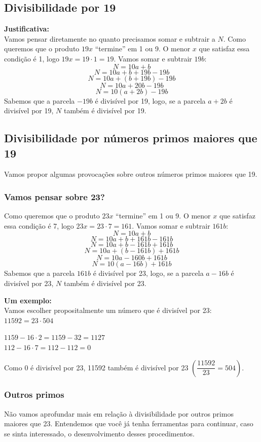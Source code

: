 \documentclass[12pt,a4paper]{article}
\begin{document}
		\subsection{Divisibilidade por 19}
		\textbf{Justificativa:}\\
		Vamos pensar diretamente no quanto precisamos somar e subtrair a $N$. Como queremos que o produto $19x$ ``termine'' em 1 ou 9. O menor $x$ que satisfaz essa condição é 1, logo $19x = 19 \cdot 1 = 19$. Vamos somar e subtrair $19b$:
		$$N = 10a + b$$
		$$N = 10  a + b + 19b - 19b$$
		$$N = 10  a + (b + 19b) - 19b$$
		$$N = 10  a + 20b - 19b$$
		$$N = 10  (a + 2b) - 19b$$		
		Sabemos que a parcela $-19b$ é divisível por 19, logo, se a parcela $a + 2b$ é divisível por 19, $N$ também é divisível por 19.
		
		\subsection{Divisibilidade por números primos maiores que 19}
		
		Vamos propor algumas provocações sobre outros números primos maiores que 19.
		
		\subsubsection{Vamos pensar sobre 23?}
		Como queremos que o produto $23x$ ``termine'' em 1 ou 9. O menor $x$ que satisfaz essa condição é 7, logo $23x = 23 \cdot 7 = 161$. Vamos somar e subtrair $161b$:		
		$$N = 10a + b$$
		$$N = 10  a + b + 161b - 161b$$
		$$N = 10  a + b - 161b + 161b$$
		$$N = 10  a + (b - 161b) + 161b$$
		$$N = 10  a - 160b + 161b$$
		$$N = 10  (a -16b) + 161b$$		
		Sabemos que a parcela $161b$ é divisível por 23, logo, se a parcela $a - 16b$ é divisível por 23, $N$ também é divisível por 23.
		
		\textbf{Um exemplo:}\\
		Vamos escolher propositalmente um número que é divisível por 23: $11592 = 23 \cdot 504$
		
		$1159 - 16 \cdot 2 = 1159 - 32 = 1127$\\
		$112 - 16 \cdot 7 = 112 - 112 = 0$
		
		Como 0 é divisível por 23, 11592 também é divisível por 23 $\left( \dfrac{11592}{23} = 504 \right)$.
		
		\subsubsection{Outros primos}
		Não vamos aprofundar mais em relação à divisibilidade por outros primos maiores que 23. Entendemos que você já tenha ferramentas para continuar, caso se sinta interessado, o desenvolvimento desses procedimentos.
		
\end{document}
